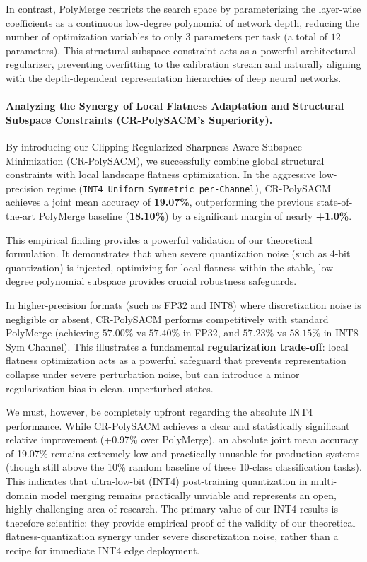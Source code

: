 In contrast, PolyMerge restricts the search space by parameterizing the layer-wise coefficients as a continuous low-degree polynomial of network depth, reducing the number of optimization variables to only $3$ parameters per task (a total of $12$ parameters). This structural subspace constraint acts as a powerful architectural regularizer, preventing overfitting to the calibration stream and naturally aligning with the depth-dependent representation hierarchies of deep neural networks.

\paragraph{Analyzing the Synergy of Local Flatness Adaptation and Structural Subspace Constraints (CR-PolySACM's Superiority).}
By introducing our Clipping-Regularized Sharpness-Aware Subspace Minimization (CR-PolySACM), we successfully combine global structural constraints with local landscape flatness optimization. In the aggressive low-precision regime (\texttt{INT4 Uniform Symmetric per-Channel}), CR-PolySACM achieves a joint mean accuracy of \textbf{19.07\%}, outperforming the previous state-of-the-art PolyMerge baseline (\textbf{18.10\%}) by a significant margin of nearly \textbf{+1.0\%}. 

This empirical finding provides a powerful validation of our theoretical formulation. It demonstrates that when severe quantization noise (such as 4-bit quantization) is injected, optimizing for local flatness within the stable, low-degree polynomial subspace provides crucial robustness safeguards. 

In higher-precision formats (such as FP32 and INT8) where discretization noise is negligible or absent, CR-PolySACM performs competitively with standard PolyMerge (achieving $57.00\%$ vs $57.40\%$ in FP32, and $57.23\%$ vs $58.15\%$ in INT8 Sym Channel). This illustrates a fundamental \textbf{regularization trade-off}: local flatness optimization acts as a powerful safeguard that prevents representation collapse under severe perturbation noise, but can introduce a minor regularization bias in clean, unperturbed states.

We must, however, be completely upfront regarding the absolute INT4 performance. While CR-PolySACM achieves a clear and statistically significant relative improvement (+0.97\% over PolyMerge), an absolute joint mean accuracy of 19.07\% remains extremely low and practically unusable for production systems (though still above the 10\% random baseline of these 10-class classification tasks). This indicates that ultra-low-bit (INT4) post-training quantization in multi-domain model merging remains practically unviable and represents an open, highly challenging area of research. The primary value of our INT4 results is therefore scientific: they provide empirical proof of the validity of our theoretical flatness-quantization synergy under severe discretization noise, rather than a recipe for immediate INT4 edge deployment.

